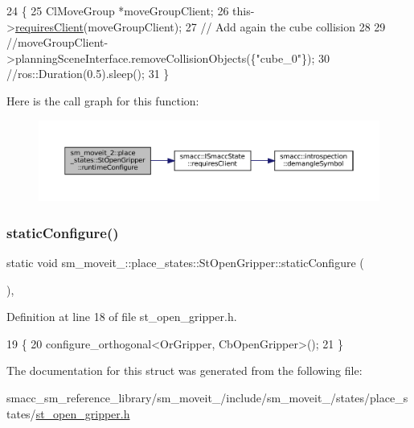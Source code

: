 \begin{DoxyCode}
24     \{
25         ClMoveGroup *moveGroupClient;
26         this->\hyperlink{classsmacc_1_1ISmaccState_a7f95c9f0a6ea2d6f18d1aec0519de4ac}{requiresClient}(moveGroupClient);
27         \textcolor{comment}{// Add again the cube collision}
28 
29         \textcolor{comment}{//moveGroupClient->planningSceneInterface.removeCollisionObjects(\{"cube\_0"\});}
30         \textcolor{comment}{//ros::Duration(0.5).sleep();}
31     \}
\end{DoxyCode}
Here is the call graph for this function\+:
\nopagebreak
\begin{figure}[H]
\begin{center}
\leavevmode
\includegraphics[width=350pt]{structsm__moveit__2_1_1place__states_1_1StOpenGripper_a80b566ae6d13f1b0998c56dbef867579_cgraph}
\end{center}
\end{figure}
\mbox{\label{structsm__moveit__2_1_1place__states_1_1StOpenGripper_ae141b104518bee068012c8fbd9e2ced4}} 
\subsubsection{\texorpdfstring{static\+Configure()}{staticConfigure()}}
{\footnotesize\ttfamily static void sm\+\_\+moveit\+\_\+::place\+\_\+states\+::\+St\+Open\+Gripper\+::static\+Configure (\begin{DoxyParamCaption}{ }\end{DoxyParamCaption})\hspace{0.3cm}{\ttfamily [inline]}, {\ttfamily [static]}}



Definition at line 18 of file st\+\_\+open\+\_\+gripper.\+h.


\begin{DoxyCode}
19     \{
20         configure\_orthogonal<OrGripper, CbOpenGripper>();
21     \}
\end{DoxyCode}


The documentation for this struct was generated from the following file\+:\begin{DoxyCompactItemize}
\item 
smacc\+\_\+sm\+\_\+reference\+\_\+library/sm\+\_\+moveit\+\_/include/sm\+\_\+moveit\+\_/states/place\+\_\+states/\hyperlink{2_2include_2sm__moveit__2_2states_2place__states_2st__open__gripper_8h}{st\+\_\+open\+\_\+gripper.\+h}\end{DoxyCompactItemize}
